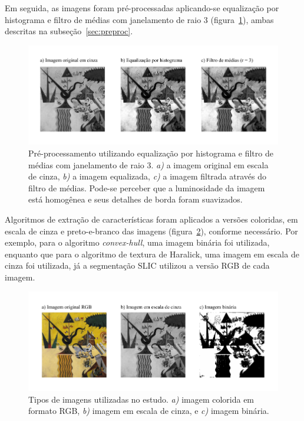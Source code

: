 Em seguida, as imagens foram pré-processadas aplicando-se equalização
por histograma e filtro de médias com janelamento de raio 3
(figura~\ref{fig:eq}), ambas descritas na subseção~\ref{sec:preproc}.

\begin{figure}[ht!]
\begin{center}
         \caption{Pré-processamento utilizando equalização por histograma
        e filtro de médias com janelamento de raio 3. \textit{a)} a
        imagem original em escala de cinza, \textit{b)} a imagem
        equalizada, \textit{c)} a imagem filtrada através do filtro de
        médias. Pode-se perceber que a luminosidade da imagem está
        homogênea e seus detalhes de borda foram suavizados.}
        \label{fig:eq}
        \includegraphics[scale=1.2]{figs/passos_eq}
     \fonteminha
\end{center}
\end{figure}

Algoritmos de extração de características foram aplicados a versões
coloridas, em escala de cinza e preto-e-branco das imagens
(figura~\ref{fig:tipos}), conforme necessário. Por exemplo, para o algoritmo
\textit{convex-hull}, uma imagem binária foi utilizada, enquanto que para o
algoritmo de textura de Haralick, uma imagem em escala de cinza foi
utilizada, já a segmentação SLIC utilizou a versão RGB de cada
imagem.

\begin{figure}[ht!]
\begin{center}
         \caption{Tipos de imagens utilizadas no estudo. \textit{a)}
        imagem colorida em formato RGB, \textit{b)} imagem em
        escala de cinza, e \textit{c)} imagem bi\-ná\-ria.}
        \label{fig:tipos}
        \includegraphics[scale=1.2]{figs/passos_tipos}
       \fonteminha
\end{center}
\end{figure}

